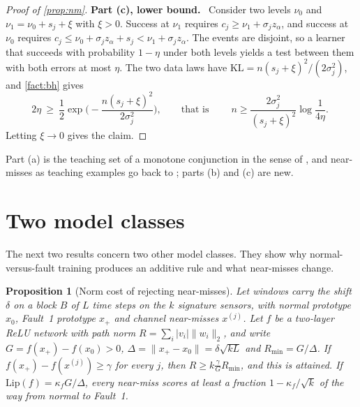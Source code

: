 \documentclass[11pt]{article}
\numberwithin{equation}{section}
\theoremstyle{plain}
\newtheorem{proposition}{Proposition}
\newcommand{\step}[1]{\par\medskip\noindent\textbf{#1}\ }
\begin{document}
\begin{proof}[Proof of \cref{prop:nm}]
\step{Part (c), lower bound.} Consider two levels $\nu_0$ and $\nu_1=\nu_0+s_j+\xi$ with $\xi>0$. Success at $\nu_1$ requires $c_j\ge\nu_1+\sigma_jz_\alpha$, and success at $\nu_0$ requires $c_j\le\nu_0+\sigma_jz_\alpha+s_j<\nu_1+\sigma_jz_\alpha$. The events are disjoint, so a learner that succeeds with probability $1-\eta$ under both levels yields a test between them with both errors at most $\eta$. The two data laws have $\mathrm{KL}=n(s_j+\xi)^2/(2\sigma_j^2)$, and \cref{fact:bh} gives
\begin{equation}\label{eq:bh}
  2\eta\ \ge\ \frac12\exp\Big(-\frac{n(s_j+\xi)^2}{2\sigma_j^2}\Big),
  \qquad\text{that is}\qquad
  \boxed{\;n\ge\frac{2\sigma_j^2}{(s_j+\xi)^2}\log\frac1{4\eta}.\;}
\end{equation}
Letting $\xi\to0$ gives the claim.
\end{proof}

Part (a) is the teaching set of a monotone conjunction in the sense of \citet{goldman1995}, and near-misses as teaching examples go back to \citet{winston1970}; parts (b) and (c) are new.

\section{Two model classes}\label{sec:models}

The next two results concern two other model classes. They show why normal-versus-fault training produces an additive rule and what near-misses change.

\begin{proposition}[Norm cost of rejecting near-misses]\label{prop:norm}
Let windows carry the shift $\delta$ on a block $B$ of $L$ time steps on the $k$ signature sensors, with normal prototype $x_0$, Fault~1 prototype $x_+$ and channel near-misses $x^{(j)}$. Let $f$ be a two-layer ReLU network with path norm $R=\sum_i|v_i|\|w_i\|_2$, and write $G=f(x_+)-f(x_0)>0$, $\Delta=\|x_+-x_0\|=\delta\sqrt{kL}$ and $R_{\min}=G/\Delta$. If $f(x_+)-f(x^{(j)})\ge\gamma$ for every $j$, then $R\ge k\frac{\gamma}{G}R_{\min}$, and this is attained. If $\mathrm{Lip}(f)=\kappa_fG/\Delta$, every near-miss scores at least a fraction $1-\kappa_f/\sqrt k$ of the way from normal to Fault~1.
\end{proposition}
\end{document}
